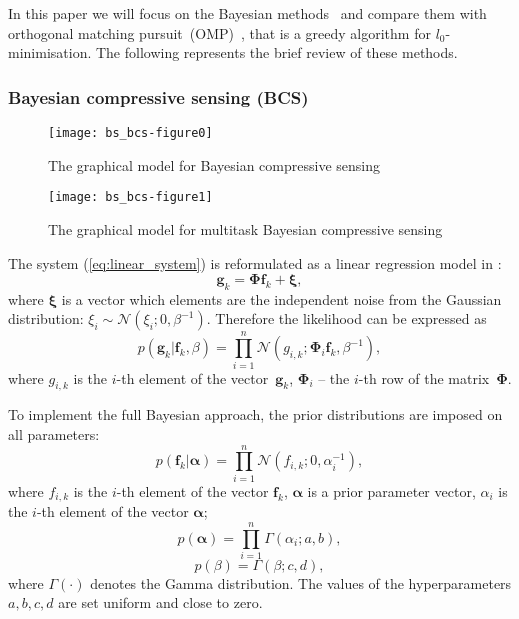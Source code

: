 \documentclass[conference]{IEEEtran}
\begin{document}
In this paper we will focus on the Bayesian methods~\cite{Carin2008bcs,Carin2009mcs} and compare them with orthogonal matching pursuit~(OMP)~\cite{Mallat93}, that is a greedy algorithm for $l_0$-minimisation. The following represents the brief review of these methods.

\subsubsection{Bayesian compressive sensing (BCS)}

\begin{figure}[!t]
\begin{center}
\texttt{[image: bs\_bcs-figure0]}
\caption{The graphical model for Bayesian compressive sensing}
\label{pic:bcs_gm}
\end{center}
\end{figure}

\begin{figure}[!t]
\begin{center}
\texttt{[image: bs\_bcs-figure1]}
\caption{The graphical model for multitask Bayesian compressive sensing}
\label{pic:mt_gm}
\end{center}
\end{figure}


The system (\ref{eq:linear_system}) is reformulated as a linear regression model in \cite{Carin2008bcs}:
\begin{equation}
\mathbf{g}_k = \mathbf{\Phi}\mathbf{f}_k + \boldsymbol{\xi},
\end{equation}
where $\boldsymbol{\xi}$ is a vector which elements are the independent noise from the Gaussian distribution: $\xi_i\sim\mathcal{N}(\xi_i;0,\beta^{-1})$. Therefore the likelihood can be expressed as
\begin{equation}
p(\mathbf{g}_{k} | \mathbf{f}_k, \beta) = \prod\limits_{i=1}^n\mathcal{N}(g_{i, k};\mathbf{\Phi}_i\mathbf{f}_k,\beta^{-1}),
\end{equation}
where $g_{i, k}$ is the $i$-th element of the vector~$\mathbf{g}_k$, $\mathbf{\Phi}_i$ -- the $i$-th row of the matrix~$\mathbf{\Phi}$.

To implement the full Bayesian approach, the prior distributions are imposed on all parameters:
\begin{equation}
p(\mathbf{f}_k | \boldsymbol\alpha) = \prod\limits_{i=1}^n\mathcal{N}(f_{i, k};0,\alpha_i^{-1}),
\end{equation}
where $f_{i, k}$ is the $i$-th element of the vector $\mathbf{f}_k$, $\boldsymbol{\alpha}$ is a prior parameter vector, $\alpha_i$ is the $i$-th element of the vector $\boldsymbol{\alpha}$;
\begin{equation}
p(\boldsymbol\alpha) = \prod\limits_{i=1}^n\Gamma(\alpha_i;a,b),
\end{equation}
\begin{equation}
p(\beta) = \Gamma(\beta;c,d),
\end{equation}
where $\Gamma(\cdot)$ denotes the Gamma distribution. The values of the hyperparameters $a, b, c, d$ are set uniform and close to zero.
\end{document}
